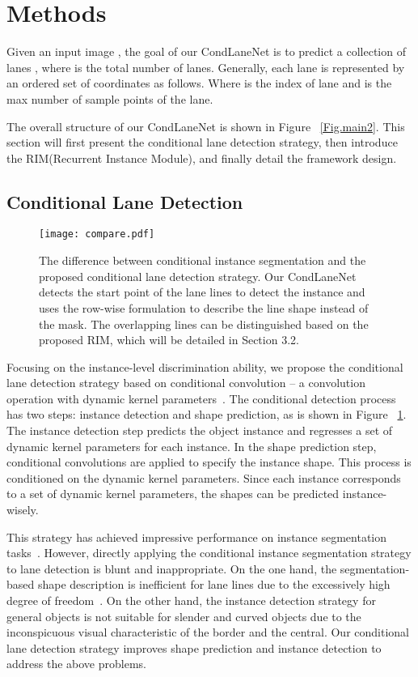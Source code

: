 \documentclass[10pt,twocolumn,letterpaper]{article}
\begin{document}
\section{Methods}

Given an input image , the goal of our CondLaneNet is to predict a collection of lanes , where  is the total number of lanes. Generally, each lane  is represented by an ordered set of coordinates as follows.
Where  is the index of lane and  is the max number of sample points of the  lane. 

The overall structure of our CondLaneNet is shown in Figure ~\ref{Fig.main2}.
This section will first present the conditional lane detection strategy, then introduce the RIM(Recurrent Instance Module), and finally detail the framework design.

\subsection{Conditional Lane Detection}

\begin{figure}[ht]
\centering
\texttt{[image: compare.pdf]}
\caption{The difference between conditional instance segmentation and the proposed conditional lane detection strategy. Our CondLaneNet detects the start point of the lane lines to detect the instance and uses the row-wise formulation to describe the line shape instead of the mask. The overlapping lines can be distinguished based on the proposed RIM, which will be detailed in Section 3.2.} \label{Fig.compare} \end{figure}

Focusing on the instance-level discrimination ability, we propose the conditional lane detection strategy based on conditional convolution -- a convolution operation with dynamic kernel parameters~\cite{jia2016dynamic,yang2019condconv}. The conditional detection process~\cite{tian2020conditional, wang2020solov2} has two steps: instance detection and shape prediction, as is shown in Figure ~\ref{Fig.compare}. The instance detection step predicts the object instance and regresses a set of dynamic kernel parameters for each instance. In the shape prediction step, conditional convolutions are applied to specify the instance shape. This process is conditioned on the dynamic kernel parameters. Since each instance corresponds to a set of dynamic kernel parameters, the shapes can be predicted instance-wisely.

This strategy has achieved impressive performance on instance segmentation tasks~\cite{tian2020conditional, wang2020solov2}. However, directly applying the conditional instance segmentation strategy to lane detection is blunt and inappropriate. On the one hand, the segmentation-based shape description is inefficient for lane lines due to the excessively high degree of freedom~\cite{qin2020ultra}. On the other hand, the instance detection strategy for general objects is not suitable for slender and curved objects due to the inconspicuous visual characteristic of the border and the central. Our conditional lane detection strategy improves shape prediction and instance detection to address the above problems.
\end{document}
